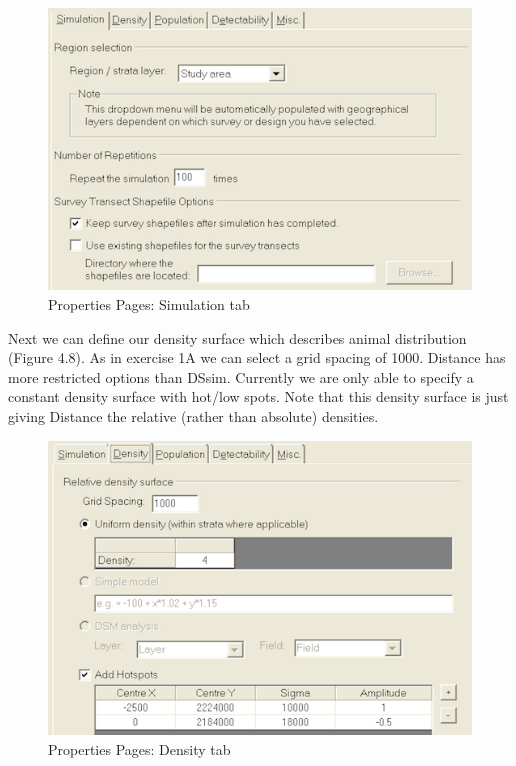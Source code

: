 \documentclass[]{book}
\theoremstyle{definition}
\theoremstyle{definition}
\theoremstyle{remark}
\begin{document}
\begin{figure}
\centering
\includegraphics{images/simulation.png}
\caption{Properties Pages: Simulation tab}
\end{figure}

Next we can define our density surface which describes animal
distribution (Figure 4.8). As in exercise 1A we can select a grid
spacing of 1000. Distance has more restricted options than DSsim.
Currently we are only able to specify a constant density surface with
hot/low spots. Note that this density surface is just giving Distance
the relative (rather than absolute) densities.

\begin{figure}
\centering
\includegraphics{images/density.png}
\caption{Properties Pages: Density tab}
\end{figure}
\end{document}
